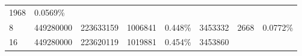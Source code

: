 \documentclass[11pt]{article}
\begin{document}
\begin{longtable}[]{@{}llllllll@{}}
\begin{minipage}[t]{0.10\columnwidth}
1968\strut
\end{minipage} & \begin{minipage}[t]{0.10\columnwidth}\raggedright\strut
0.0569\%\strut
\end{minipage}\tabularnewline
\begin{minipage}[t]{0.14\columnwidth}\raggedright\strut
8\strut
\end{minipage} & \begin{minipage}[t]{0.10\columnwidth}\raggedright\strut
449280000\strut
\end{minipage} & \begin{minipage}[t]{0.08\columnwidth}\raggedright\strut
223633159\strut
\end{minipage} & \begin{minipage}[t]{0.09\columnwidth}\raggedright\strut
1006841\strut
\end{minipage} & \begin{minipage}[t]{0.09\columnwidth}\raggedright\strut
0.448\%\strut
\end{minipage} & \begin{minipage}[t]{0.08\columnwidth}\raggedright\strut
3453332\strut
\end{minipage} & \begin{minipage}[t]{0.10\columnwidth}\raggedright\strut
2668\strut
\end{minipage} & \begin{minipage}[t]{0.10\columnwidth}\raggedright\strut
0.0772\%\strut
\end{minipage}\tabularnewline
\begin{minipage}[t]{0.14\columnwidth}\raggedright\strut
16\strut
\end{minipage} & \begin{minipage}[t]{0.10\columnwidth}\raggedright\strut
449280000\strut
\end{minipage} & \begin{minipage}[t]{0.08\columnwidth}\raggedright\strut
223620119\strut
\end{minipage} & \begin{minipage}[t]{0.09\columnwidth}\raggedright\strut
1019881\strut
\end{minipage} & \begin{minipage}[t]{0.09\columnwidth}\raggedright\strut
0.454\%\strut
\end{minipage} & \begin{minipage}[t]{0.08\columnwidth}\raggedright\strut
3453860\strut
\end{minipage} & \begin{minipage}[t]{0.10\columnwidth}\raggedright\strut

\end{minipage}
\end{longtable}
\end{document}
